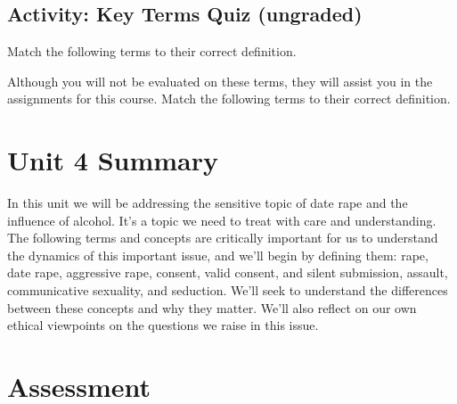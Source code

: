 \documentclass[
]{book}
\begin{document}
\hypertarget{activity-key-terms-quiz-ungraded-3}{%
\subsection*{Activity: Key Terms Quiz (ungraded)}\label{activity-key-terms-quiz-ungraded-3}}

\begin{reflect}
Match the following terms to their correct definition.

Although you will not be evaluated on these terms, they will assist you in the assignments for this course. Match the following terms to their correct definition.
\end{reflect}

\hypertarget{unit-4-summary}{%
\section*{Unit 4 Summary}\label{unit-4-summary}}

In this unit we will be addressing the sensitive topic of date rape and the influence of alcohol. It's a topic we need to treat with care and understanding. The following terms and concepts are critically important for us to understand the dynamics of this important issue, and we'll begin by defining them: rape, date rape, aggressive rape, consent, valid consent, and silent submission, assault, communicative sexuality, and seduction. We'll seek to understand the differences between these concepts and why they matter. We'll also reflect on our own ethical viewpoints on the questions we raise in this issue.

\hypertarget{assessment-7}{%
\section*{Assessment}\label{assessment-7}}
\end{document}
